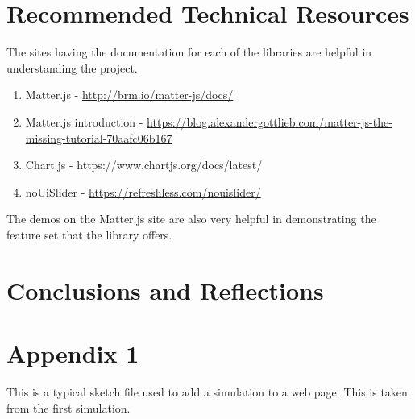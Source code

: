 \documentclass[onecolumn, draftclsnofoot,10pt, compsoc]{IEEEtran}
\begin{document}
\section{Recommended Technical Resources}
The sites having the documentation for each of the libraries are helpful in understanding the project.
\begin{enumerate}
    \item Matter.js - \url{http://brm.io/matter-js/docs/}
    \item Matter.js introduction - 
        \url{https://blog.alexandergottlieb.com/matter-js-the-missing-tutorial-70aafc06b167}
    \item Chart.js - https://www.chartjs.org/docs/latest/
    \item noUiSlider - \url{https://refreshless.com/nouislider/}
\end{enumerate}

The demos on the Matter.js site are also very helpful in demonstrating the feature set that the library offers.


\section{Conclusions and Reflections}
    





\newpage

\section{Appendix 1}
This is a typical sketch file used to add a simulation to a web page. This is taken from the first simulation. 
\end{document}
